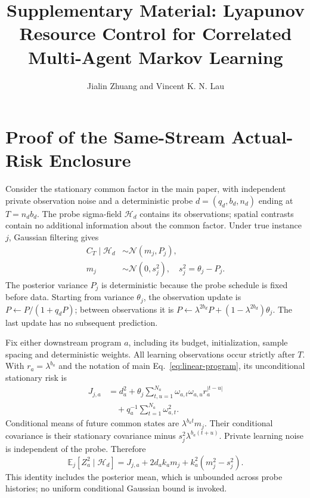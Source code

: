 \documentclass[journal]{IEEEtran}
\title{Supplementary Material: Lyapunov Resource Control for Correlated Multi-Agent Markov Learning}
\author{Jialin Zhuang and Vincent K. N. Lau}
\newcommand{\E}{\mathbb E}
\begin{document}
\maketitle
\renewcommand{\theequation}{S\arabic{equation}}

\section{Proof of the Same-Stream Actual-Risk Enclosure}
Consider the stationary common factor in the main paper, with independent private observation noise and a deterministic probe $d=(q_d,b_d,n_d)$ ending at $T=n_db_d$.
The probe sigma-field $\mathcal H_d$ contains its observations; spatial contrasts contain no additional information about the common factor.
Under true instance $j$, Gaussian filtering gives
\begin{align}
C_T\mid\mathcal H_d&\sim\mathcal N(m_j,P_j),\nonumber\\
m_j&\sim\mathcal N(0,s_j^2),\quad s_j^2=\theta_j-P_j.
\end{align}
The posterior variance $P_j$ is deterministic because the probe schedule is fixed before data.
Starting from variance $\theta_j$, the observation update is $P\leftarrow P/(1+q_dP)$; between observations it is $P\leftarrow\lambda^{2b_d}P+(1-\lambda^{2b_d})\theta_j$.
The last update has no subsequent prediction.

Fix either downstream program $a$, including its budget, initialization, sample spacing and deterministic weights.
All learning observations occur strictly after $T$.
With $r_a=\lambda^{b_a}$ and the notation of main Eq.~\eqref{eq:linear-program}, its unconditional stationary risk is
\begin{align}
J_{j,a}
&=d_a^2+\theta_j\sum_{t,u=1}^{N_a}\omega_{a,t}\omega_{a,u}r_a^{|t-u|}\nonumber\\
&\quad+q_a^{-1}\sum_{t=1}^{N_a}\omega_{a,t}^2.
\label{eq:supp-exact-risk}
\end{align}
Conditional means of future common states are $\lambda^{b_at}m_j$.
Their conditional covariance is their stationary covariance minus $s_j^2\lambda^{b_a(t+u)}$.
Private learning noise is independent of the probe.
Therefore
\begin{equation}
\E_j[Z_a^2\mid\mathcal H_d]
=J_{j,a}+2d_ak_am_j+k_a^2(m_j^2-s_j^2).
\label{eq:supp-conditional-risk}
\end{equation}
This identity includes the posterior mean, which is unbounded across probe histories; no uniform conditional Gaussian bound is invoked.
\end{document}
